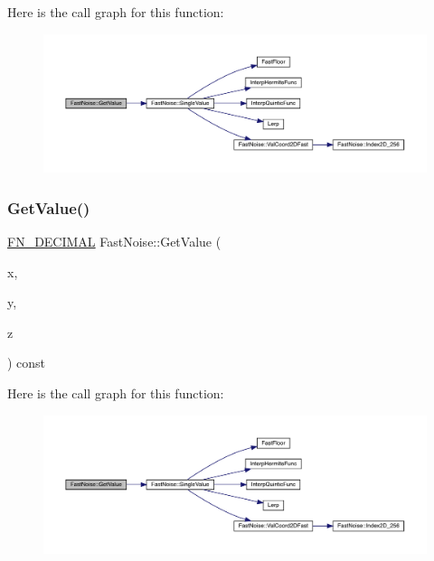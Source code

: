 Here is the call graph for this function\+:
\nopagebreak
\begin{figure}[H]
\begin{center}
\leavevmode
\includegraphics[width=350pt]{d1/dd8/class_fast_noise_a14145aaff0f8502eb5fd0f168562c69c_cgraph}
\end{center}
\end{figure}
\mbox{\label{class_fast_noise_ab2424cc7921a15da6eb683ab3bbfcbac}} 
\subsubsection{\texorpdfstring{Get\+Value()}{GetValue()}\hspace{0.1cm}{\footnotesize\ttfamily [2/2]}}
{\footnotesize\ttfamily \mbox{\hyperlink{_fast_noise_8h_a75a9ef6d2541c4921815b885bfd449c3}{F\+N\+\_\+\+D\+E\+C\+I\+M\+AL}} Fast\+Noise\+::\+Get\+Value (\begin{DoxyParamCaption}\item[{\mbox{\hyperlink{_fast_noise_8h_a75a9ef6d2541c4921815b885bfd449c3}{F\+N\+\_\+\+D\+E\+C\+I\+M\+AL}}}]{x,  }\item[{\mbox{\hyperlink{_fast_noise_8h_a75a9ef6d2541c4921815b885bfd449c3}{F\+N\+\_\+\+D\+E\+C\+I\+M\+AL}}}]{y,  }\item[{\mbox{\hyperlink{_fast_noise_8h_a75a9ef6d2541c4921815b885bfd449c3}{F\+N\+\_\+\+D\+E\+C\+I\+M\+AL}}}]{z }\end{DoxyParamCaption}) const}

Here is the call graph for this function\+:
\nopagebreak
\begin{figure}[H]
\begin{center}
\leavevmode
\includegraphics[width=350pt]{d1/dd8/class_fast_noise_ab2424cc7921a15da6eb683ab3bbfcbac_cgraph}
\end{center}
\end{figure}
\mbox{\label{class_fast_noise_a637789887aa7727d701d9dbcb261a170}} 
